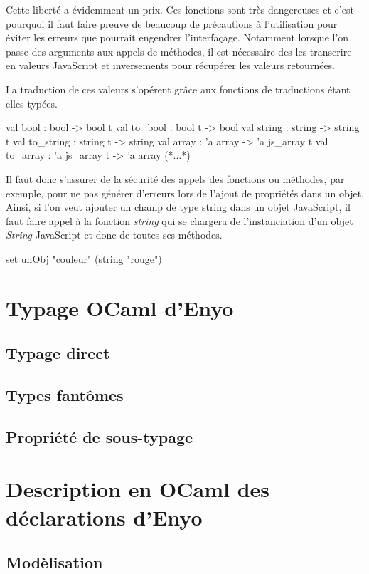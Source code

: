 \documentclass[11pt,a4paper]{report}
\begin{document}
Cette liberté a évidemment un prix. Ces fonctions sont très dangereuses et c'est pourquoi il faut 
faire preuve de beaucoup de précautions à l'utilisation pour éviter les erreurs que pourrait engendrer
l'interfaçage.
Notamment lorsque l'on passe des arguments aux appels de méthodes, il est nécessaire des les transcrire
en valeurs JavaScript et inversements pour récupérer les valeurs retournées.

La traduction de ces valeurs s'opérent grâce aux fonctions de traductions étant elles typées.
\begin{OCaml}
  val bool : bool -> bool t
  val to_bool : bool t -> bool
  val string : string -> string t
  val to_string : string t -> string
  val array : 'a array -> 'a js_array t
  val to_array : 'a js_array t -> 'a array
  (*...*)
\end{OCaml}

Il faut donc s'assurer de la sécurité des appels des fonctions ou méthodes, par exemple,
pour ne pas générer d'erreurs lors de l'ajout de propriétés dans un objet. Ainsi, 
si l'on veut ajouter un champ de type string dans un objet JavaScript, il faut
faire appel à la fonction \emph{string} qui se chargera de l'instanciation d'un objet \emph{String}
JavaScript et donc de toutes ses méthodes.

\begin{OCaml}
  set unObj "couleur" (string "rouge")
\end{OCaml}


\section{Typage OCaml d'Enyo}
\subsection{Typage direct}
\subsection{Types fantômes}
\subsection{Propriété de sous-typage}

\section{Description en OCaml des déclarations d'Enyo}
\subsection{Modèlisation}
\end{document}
